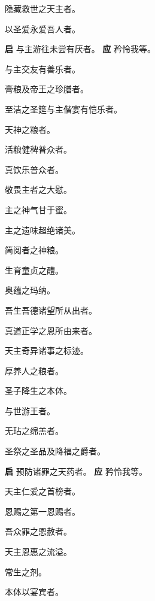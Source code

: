 \documentclass[UTF8,17pt]{ctexart}
\begin{document}
 隐藏救世之天主者。

 以圣爱永爱吾⼈者。

\textbf{启} \quad 与主游往未尝有厌者。 \hfill \textbf{应} \quad 矜怜我等。

 与主交友有善乐者。

 膏粮及帝王之珍膳者。

 ⾄洁之圣筵与主偕宴有恺乐者。

 天神之粮者。

 活粮健稗普众者。

 真饮乐普众者。

 敬畏主者之⼤慰。

 主之神⽓⽢于蜜。

 主之遗味超绝诸美。

 简阅者之神粮。

 ⽣育童贞之醴。

 奥蕴之玛纳。

 吾⽣吾德诸望所从出者。

 真道正学之恩所由来者。

 天主奇异诸事之标迹。

 厚养⼈之粮者。

 圣⼦降⽣之本体。

 与世游王者。

 ⽆玷之绵羔者。

 圣祭之圣品及降福之爵者。

\textbf{启} \quad 预防诸罪之天药者。 \hfill \textbf{应} \quad 矜怜我等。

 天主仁爱之⾸榜者。

 恩赐之第⼀恩赐者。

 吾众罪之恩赦者。

 天主恩惠之流溢。

 常⽣之剂。

 本体以宴宾者。
\end{document}
